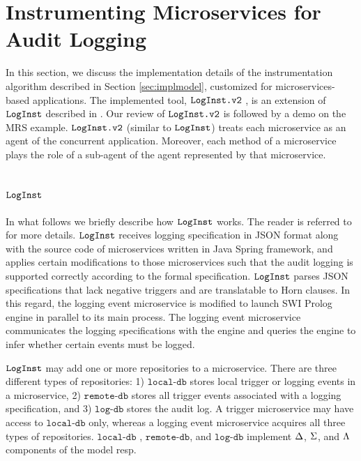 \section{Instrumenting Microservices for Audit Logging}\label{sec:impl}
In this section, we discuss the implementation details of the instrumentation algorithm described in Section \ref{sec:implmodel}, customized for microservices-based applications. The implemented tool, $\texttt{LogInst.v2}$ \cite{github3}, is an extension of $\texttt{LogInst}$ \cite{github1} described in \cite{stpsa21}. Our review of $\texttt{LogInst.v2}$  is followed by a demo on the MRS example. $\texttt{LogInst.v2}$ (similar to $\texttt{LogInst}$) treats each microservice as an agent of the concurrent application. Moreover, each method of a microservice plays the role of a sub-agent of the agent represented by that microservice. 

\subsection{$\texttt{LogInst}$}
In what follows we briefly describe how $\texttt{LogInst}$ works. The reader is referred to \cite{stpsa21} for more details. $\texttt{LogInst}$ receives logging specification in JSON format along with the source code of microservices written in Java Spring framework, and applies certain modifications to those microservices such that the audit logging is supported correctly according to the formal specification. $\texttt{LogInst}$ parses JSON specifications that lack negative triggers and are translatable to Horn clauses. In this regard, the logging event microservice is modified to launch SWI Prolog  \cite{swi} engine in parallel to its main process. The logging event microservice communicates the logging specifications with the engine and queries the engine to infer whether certain events must be logged.

$\texttt{LogInst}$ may add one or more repositories to a microservice. There are three different types of repositories: 1) $\texttt{local-db}$ stores local trigger or logging events in a microservice, 2) $\texttt{remote-db}$ stores all trigger events associated with a logging specification, and 3) $\texttt{log-db}$ stores the audit log. A trigger microservice may have access to  $\texttt{local-db}$ only, whereas a logging event microservice acquires all three types of repositories. $\texttt{local-db}$ , $\texttt{remote-db}$, and $\texttt{log-db}$ implement $\Delta$, $\Sigma$, and $\Lambda$ components of the model resp.

